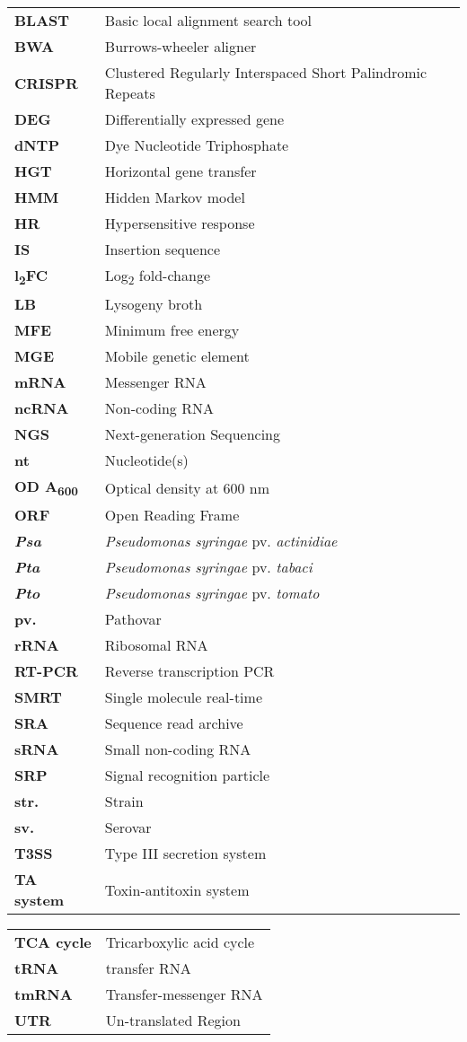 \begin{tabular}{ll}
\textbf{BLAST} & Basic local alignment search tool\\
\textbf{BWA} & Burrows-wheeler aligner\\
\textbf{CRISPR} & Clustered Regularly Interspaced Short Palindromic Repeats\\
\textbf{DEG} & Differentially expressed gene\\
\textbf{dNTP} & Dye Nucleotide Triphosphate\\
\textbf{HGT} & Horizontal gene transfer\\
\textbf{HMM} & Hidden Markov model\\
\textbf{HR} & Hypersensitive response\\
\textbf{IS} & Insertion sequence\\
\textbf{l\textsubscript{2}FC} & Log\textsubscript{2} fold-change \\
\textbf{LB} & Lysogeny broth\\
\textbf{MFE} & Minimum free energy \\
\textbf{MGE} & Mobile genetic element\\
\textbf{mRNA} & Messenger RNA\\
\textbf{ncRNA} & Non-coding RNA\\
\textbf{NGS} & Next-generation Sequencing\\
\textbf{nt} & Nucleotide(s)\\
\textbf{OD A\textsubscript{600}} & Optical density at 600 nm\\
\textbf{ORF} & Open Reading Frame\\
\textbf{\textit{Psa}} & \textit{Pseudomonas syringae} pv. \textit{actinidiae}\\
\textbf{\textit{Pta}} & \textit{Pseudomonas syringae} pv. \textit{tabaci}\\
\textbf{\textit{Pto}} & \textit{Pseudomonas syringae} pv. \textit{tomato}\\
\textbf{pv.} & Pathovar\\
\textbf{rRNA} & Ribosomal RNA\\
\textbf{RT-PCR} & Reverse transcription PCR\\
\textbf{SMRT} & Single molecule real-time\\
\textbf{SRA} & Sequence read archive \\
\textbf{sRNA} & Small non-coding RNA\\
\textbf{SRP} & Signal recognition particle\\
\textbf{str.} & Strain\\
\textbf{sv.} & Serovar\\
\textbf{T3SS} & Type III secretion system\\
\textbf{TA system} & Toxin-antitoxin system\\
\end{tabular}
\newpage
\begin{tabular}{ll}
\textbf{TCA cycle} & Tricarboxylic acid cycle\\
\textbf{tRNA} & transfer RNA\\
\textbf{tmRNA} & Transfer-messenger RNA\\
\textbf{UTR} & Un-translated Region\\
\end{tabular}
 

